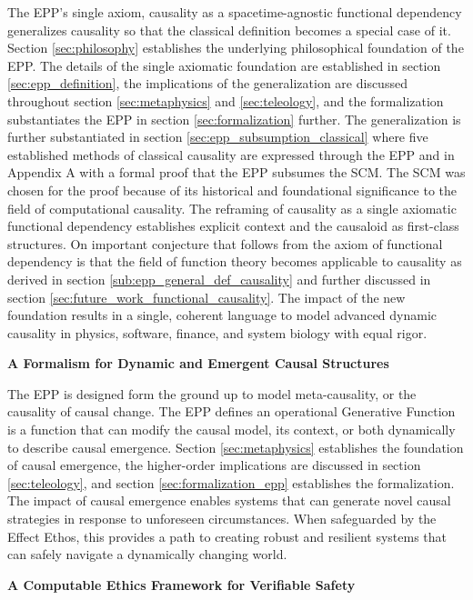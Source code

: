 The EPP's single axiom, causality as a spacetime-agnostic functional dependency generalizes causality so that the classical definition becomes a special case of it. Section \ref{sec:philosophy} establishes the underlying philosophical foundation of the EPP. The details of the single axiomatic foundation are established in section \ref{sec:epp_definition}, the implications of the generalization are discussed throughout section \ref{sec:metaphysics} and \ref{sec:teleology}, and the formalization substantiates the EPP in section \ref{sec:formalization} further. The generalization is further substantiated in section \ref{sec:epp_subsumption_classical} where five established methods of classical causality are expressed through the EPP  and in Appendix A with a formal proof that the EPP subsumes the SCM. The SCM was chosen for the proof because of its historical and foundational significance to the field of computational causality. The reframing of causality as a single axiomatic functional dependency establishes explicit context and the causaloid as first-class structures. On important conjecture that follows from the axiom of functional dependency is that the field of function theory becomes applicable to causality as derived in section \ref{sub:epp_general_def_causality} and further discussed in section \ref{sec:future_work_functional_causality}. The impact of the new foundation results in a single, coherent language to model advanced dynamic causality in physics, software, finance, and system biology with equal rigor.

\textbf{A Formalism for Dynamic and Emergent Causal Structures}


The EPP is designed form the ground up to model meta-causality, or the causality of causal change. The EPP defines an operational Generative Function is a function that can modify the causal model, its context, or both dynamically to describe causal emergence. Section \ref{sec:metaphysics} establishes the foundation of causal emergence, the higher-order implications are discussed in section \ref{sec:teleology}, and section \ref{sec:formalization_epp} establishes the formalization. The impact of causal emergence enables systems that can generate novel causal strategies in response to unforeseen circumstances. When safeguarded by the Effect Ethos, this provides a path to creating robust and resilient systems that can safely navigate a dynamically changing world.

\textbf{A Computable Ethics Framework for Verifiable Safety}

